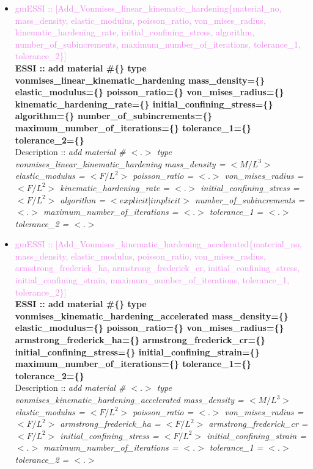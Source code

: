 \documentclass[11pt]{article}
\begin{document}
\begin{itemize}
      \item \textcolor{violet}{gmESSI :: [Add\_Vonmises\_linear\_kinematic\_hardening\{material\_no, mass\_density, elastic\_modulus, poisson\_ratio, von\_mises\_radius, kinematic\_hardening\_rate, initial\_confining\_stress, algorithm, number\_of\_subincrements, maximum\_number\_of\_iterations, tolerance\_1, tolerance\_2\}]}\\
      \textbf{ESSI :: add material \#\{\} type vonmises\_linear\_kinematic\_hardening mass\_density=\{\} elastic\_modulus=\{\} poisson\_ratio=\{\} von\_mises\_radius=\{\} kinematic\_hardening\_rate=\{\} initial\_confining\_stress=\{\} algorithm=\{\} number\_of\_subincrements=\{\} maximum\_number\_of\_iterations=\{\} tolerance\_1=\{\} tolerance\_2=\{\} }\\
      Description ::  \textit{ add material \# $<.>$ type vonmises\_linear\_kinematic\_hardening mass\_density = $<M/L^3>$ elastic\_modulus = $<F/L^2>$ poisson\_ratio = $<.>$ von\_mises\_radius = $<F/L^2>$ kinematic\_hardening\_rate = $<.>$ initial\_confining\_stress = $<F/L^2>$ algorithm = $<explicit|implicit>$ number\_of\_subincrements = $<.>$ maximum\_number\_of\_iterations = $<.>$ tolerance\_1 = $<.>$ tolerance\_2 = $<.>$} 

      \item \textcolor{violet}{gmESSI :: [Add\_Vonmises\_kinematic\_hardening\_accelerated\{material\_no, mass\_density, elastic\_modulus, poisson\_ratio, von\_mises\_radius, armstrong\_frederick\_ha, armstrong\_frederick\_cr, initial\_confining\_stress, initial\_confining\_strain, maximum\_number\_of\_iterations, tolerance\_1, tolerance\_2\}]}\\
      \textbf{ESSI :: add material \#\{\} type vonmises\_kinematic\_hardening\_accelerated mass\_density=\{\} elastic\_modulus=\{\} poisson\_ratio=\{\} von\_mises\_radius=\{\} armstrong\_frederick\_ha=\{\} armstrong\_frederick\_cr=\{\} initial\_confining\_stress=\{\} initial\_confining\_strain=\{\} maximum\_number\_of\_iterations=\{\} tolerance\_1=\{\} tolerance\_2=\{\} }\\
      Description ::  \textit{ add material \# $<.>$ type vonmises\_kinematic\_hardening\_accelerated mass\_density = $<M/L^3>$ elastic\_modulus = $<F/L^2>$ poisson\_ratio = $<.>$ von\_mises\_radius = $<F/L^2>$ armstrong\_frederick\_ha = $<F/L^2>$ armstrong\_frederick\_cr = $<F/L^2>$ initial\_confining\_stress = $<F/L^2>$ initial\_confining\_strain = $<.>$ maximum\_number\_of\_iterations = $<.>$ tolerance\_1 = $<.>$ tolerance\_2 = $<.>$} 


\end{itemize}
\end{document}
